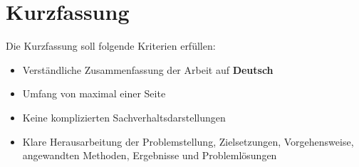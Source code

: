 \chapter{Kurzfassung}

Die Kurzfassung soll folgende Kriterien erfüllen:
\begin{itemize}
	\item Verständliche Zusammenfassung der Arbeit auf \textbf{Deutsch}
	\item Umfang von maximal einer Seite
	\item Keine komplizierten Sachverhaltsdarstellungen
	\item Klare Herausarbeitung der Problemstellung, Zielsetzungen, Vorgehensweise, angewandten Methoden, Ergebnisse und Problemlösungen
\end{itemize}